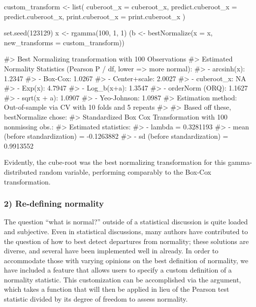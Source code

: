 \begin{Schunk}
\begin{Sinput}
custom_transform <- list(
  cuberoot_x = cuberoot_x,
  predict.cuberoot_x = predict.cuberoot_x,
  print.cuberoot_x = print.cuberoot_x
)

set.seed(123129)
x <- rgamma(100, 1, 1)
(b <- bestNormalize(x = x, new_transforms = custom_transform))
\end{Sinput}
\begin{Soutput}
#> Best Normalizing transformation with 100 Observations
#>  Estimated Normality Statistics (Pearson P / df, lower => more normal):
#>  - arcsinh(x): 1.2347
#>  - Box-Cox: 1.0267
#>  - Center+scale: 2.0027
#>  - cuberoot_x: NA
#>  - Exp(x): 4.7947
#>  - Log_b(x+a): 1.3547
#>  - orderNorm (ORQ): 1.1627
#>  - sqrt(x + a): 1.0907
#>  - Yeo-Johnson: 1.0987
#> Estimation method: Out-of-sample via CV with 10 folds and 5 repeats
#>  
#> Based off these, bestNormalize chose:
#> Standardized Box Cox Transformation with 100 nonmissing obs.:
#>  Estimated statistics:
#>  - lambda = 0.3281193 
#>  - mean (before standardization) = -0.1263882 
#>  - sd (before standardization) = 0.9913552
\end{Soutput}
\end{Schunk}

Evidently, the cube-root was the best normalizing transformation for
this gamma-distributed random variable, performing comparably to the
Box-Cox transformation.

\hypertarget{re-defining-normality}{%
\subsubsection{2) Re-defining normality}\label{re-defining-normality}}

The question ``what is normal?'' outside of a statistical discussion is
quite loaded and subjective. Even in statistical discussions, many
authors have contributed to the question of how to best detect
departures from normality; these solutions are diverse, and several have
been implemented well in  already. In order to accommodate
those with varying opinions on the best definition of normality, we have
included a feature that allows users to specify a custom definition of a
normality statistic. This customization can be accomplished via the
 argument, which takes
a function that will then be applied in lieu of the Pearson test
statistic divided by its degree of freedom to assess normality.

